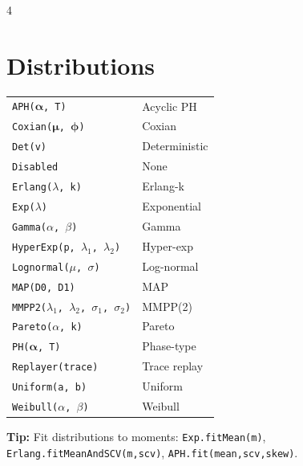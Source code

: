 \documentclass[9pt,landscape,a4paper]{extarticle}
\begin{document}
\begin{multicols}{4}
\section*{Distributions}
\begin{tabular}{@{}ll@{}}
\texttt{APH($\boldsymbol{\alpha}$, T)} & Acyclic PH \\
\texttt{Coxian($\boldsymbol{\mu}$, $\boldsymbol{\phi}$)} & Coxian \\
\texttt{Det(v)} & Deterministic \\
\texttt{Disabled} & None \\
\texttt{Erlang($\lambda$, k)} & Erlang-k \\
\texttt{Exp($\lambda$)} & Exponential \\
\texttt{Gamma($\alpha$, $\beta$)} & Gamma \\
\texttt{HyperExp(p, $\lambda_1$, $\lambda_2$)} & Hyper-exp \\
\texttt{Lognormal($\mu$, $\sigma$)} & Log-normal \\
\texttt{MAP(D0, D1)} & MAP \\
\texttt{MMPP2($\lambda_1$, $\lambda_2$, $\sigma_1$, $\sigma_2$)} & MMPP(2) \\
\texttt{Pareto($\alpha$, k)} & Pareto \\
\texttt{PH($\boldsymbol{\alpha}$, T)} & Phase-type \\
\texttt{Replayer(trace)} & Trace replay \\
\texttt{Uniform(a, b)} & Uniform \\
\texttt{Weibull($\alpha$, $\beta$)} & Weibull \\
\end{tabular}

\begin{tipbox}
\textbf{Tip:} Fit distributions to moments: \texttt{Exp.fitMean(m)}, \texttt{Erlang.fitMeanAndSCV(m,scv)}, \texttt{APH.fit(mean,scv,skew)}.
\end{tipbox}


\end{multicols}
\end{document}
